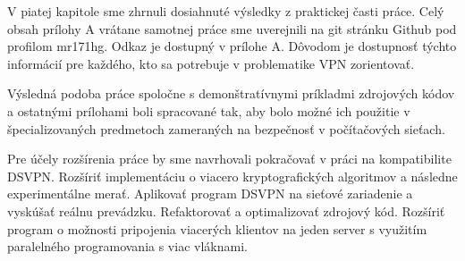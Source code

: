 V piatej kapitole sme zhrnuli dosiahnuté výsledky z praktickej časti práce. Celý obsah prílohy A vrátane samotnej práce sme uverejnili na git stránku Github pod profilom mr171hg. Odkaz je dostupný v prílohe A. Dôvodom je dostupnosť týchto informácií pre každého, kto sa potrebuje v problematike VPN zorientovať.  

Výsledná podoba práce spoločne s demonštratívnymi príkladmi zdrojových kódov a ostatnými prílohami boli spracované tak, aby bolo možné ich použitie v špecializovaných predmetoch zameraných na bezpečnosť v počítačových sieťach.

Pre účely rozšírenia práce by sme navrhovali pokračovať v práci na kompatibilite DSVPN. Rozšíriť implementáciu o viacero kryptografických algoritmov a následne experimentálne merať. Aplikovať program DSVPN na sieťové zariadenie a vyskúšať reálnu prevádzku. Refaktorovať a optimalizovať zdrojový kód. Rozšíriť program o možnosti pripojenia viacerých klientov na jeden server s využitím paralelného programovania s viac vláknami. 
